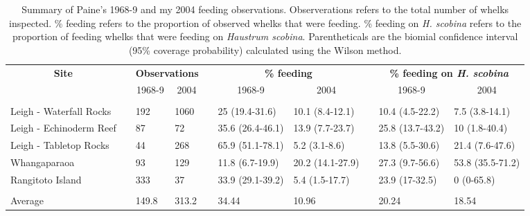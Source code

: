 \begin{table}[!tbp]
\caption{Summary of Paine's 1968-9 and my 2004 feeding observations.  Observerations refers to the total number of whelks inspected. \% feeding refers to the proportion of observed whelks that were feeding. \% feeding on \emph{H. scobina} refers to the proportion of feeding whelks that were feeding on \emph{Haustrum scobina}.  Parentheticals are the biomial confidence interval (95\% coverage probability) calculated using the Wilson method.\label{tab:summ}} 
{\centering
\begin{tabular}{lcllcllcll}
\hline
\multicolumn{1}{c}{\bfseries Site}&\multicolumn{1}{c}{\bfseries }&\multicolumn{2}{c}{\bfseries Observations}&\multicolumn{1}{c}{\bfseries }&\multicolumn{2}{c}{\bfseries \% feeding}&\multicolumn{1}{c}{\bfseries }&\multicolumn{2}{c}{\bfseries \% feeding on \emph{H. scobina}}\tabularnewline
\cline{1-1} \cline{3-4} \cline{6-7} \cline{9-10}
\multicolumn{1}{c}{}&\multicolumn{1}{c}{}&\multicolumn{1}{c}{1968-9}&\multicolumn{1}{c}{2004}&\multicolumn{1}{c}{}&\multicolumn{1}{c}{1968-9}&\multicolumn{1}{c}{2004}&\multicolumn{1}{c}{}&\multicolumn{1}{c}{1968-9}&\multicolumn{1}{c}{2004}\tabularnewline
\hline
&&&&&&&&&\tabularnewline
Leigh - Waterfall Rocks&&192&1060&&25 (19.4-31.6)&10.1 (8.4-12.1)&&10.4 (4.5-22.2)&7.5 (3.8-14.1)\tabularnewline
Leigh - Echinoderm Reef&&87&72&&35.6 (26.4-46.1)&13.9 (7.7-23.7)&&25.8 (13.7-43.2)&10 (1.8-40.4)\tabularnewline
Leigh - Tabletop Rocks&&44&268&&65.9 (51.1-78.1)&5.2 (3.1-8.6)&&13.8 (5.5-30.6)&21.4 (7.6-47.6)\tabularnewline
Whangaparaoa&&93&129&&11.8 (6.7-19.9)&20.2 (14.1-27.9)&&27.3 (9.7-56.6)&53.8 (35.5-71.2)\tabularnewline
Rangitoto Island&&333&37&&33.9 (29.1-39.2)&5.4 (1.5-17.7)&&23.9 (17-32.5)&0 (0-65.8)\tabularnewline
\hline
&&&&&&&&&\tabularnewline
Average&&149.8&313.2&&34.44&10.96&&20.24&18.54\tabularnewline
\hline
\end{tabular}}
\end{table}
